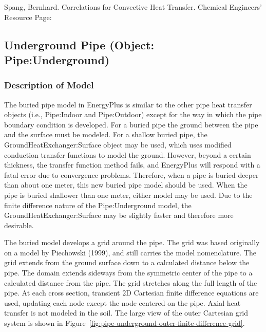 Spang, Bernhard. Correlations for Convective Heat Transfer. Chemical Engineers' Resource Page:

\subsection{Underground Pipe (Object: Pipe:Underground)}\label{underground-pipe-object-pipeunderground}

\subsubsection{Description of Model}\label{description-of-model-000}

The buried pipe model in EnergyPlus is similar to the other pipe heat transfer objects (i.e., Pipe:Indoor and Pipe:Outdoor) except for the way in which the pipe boundary condition is developed. For a buried pipe the ground between the pipe and the surface must be modeled. For a shallow buried pipe, the GroundHeatExchanger:Surface object may be used, which uses modified conduction transfer functions to model the ground. However, beyond a certain thickness, the transfer function method fails, and EnergyPlus will respond with a fatal error due to convergence problems. Therefore, when a pipe is buried deeper than about one meter, this new buried pipe model should be used. When the pipe is buried shallower than one meter, either model may be used. Due to the finite difference nature of the Pipe:Underground model, the GroundHeatExchanger:Surface may be slightly faster and therefore more desirable.

The buried model develops a grid around the pipe. The grid was based originally on a model by Piechowski (1999), and still carries the model nomenclature. The grid extends from the ground surface down to a calculated distance below the pipe. The domain extends sideways from the symmetric center of the pipe to a calculated distance from the pipe. The grid stretches along the full length of the pipe. At each cross section, transient 2D Cartesian finite difference equations are used, updating each node except the node centered on the pipe. Axial heat transfer is not modeled in the soil. The large view of the outer Cartesian grid system is shown in Figure~\ref{fig:pipe-underground-outer-finite-difference-grid}.

